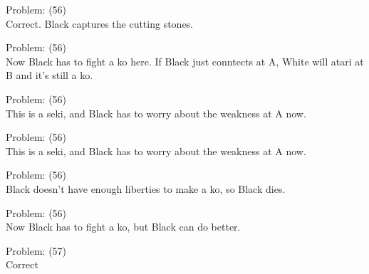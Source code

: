 \documentclass[11pt]{article}
\begin{document}
\begin{minipage}[t]{0.5\textwidth}
  {\centering
  
  Problem: (56)\\
  Correct. Black captures the cutting stones.\\
  }
\end{minipage}
\begin{minipage}[t]{0.5\textwidth}
  {\centering
  
  Problem: (56)\\
  Now Black has to fight a ko here. If Black just conntects at A, White will atari at B and it's still a ko.\\
  }
\end{minipage}
\begin{minipage}[t]{0.5\textwidth}
  {\centering
  
  Problem: (56)\\
  This is a seki, and Black has to worry about the weakness at A now.\\
  }
\end{minipage}
\begin{minipage}[t]{0.5\textwidth}
  {\centering
  
  Problem: (56)\\
  This is a seki, and Black has to worry about the weakness at A now.\\
  }
\end{minipage}
\begin{minipage}[t]{0.5\textwidth}
  {\centering
  
  Problem: (56)\\
  Black doesn't have enough liberties to make a ko, so Black dies.\\
  }
\end{minipage}
\begin{minipage}[t]{0.5\textwidth}
  {\centering
  
  Problem: (56)\\
  Now Black has to fight a ko, but Black can do better.\\
  }
\end{minipage}
\begin{minipage}[t]{0.5\textwidth}
  {\centering
  
  Problem: (57)\\
  Correct\\
  }
\end{minipage}
\end{document}
